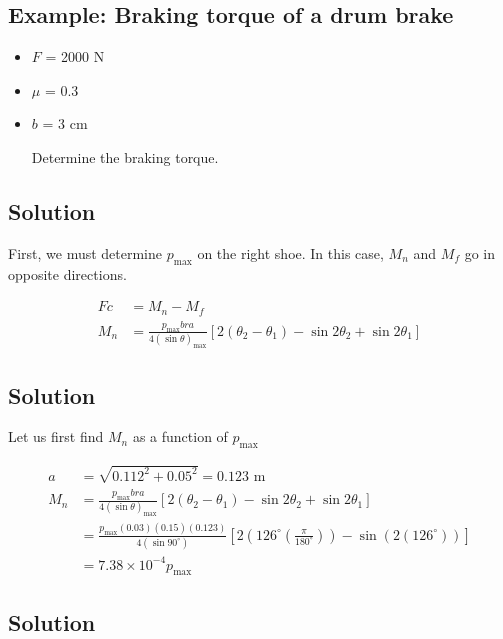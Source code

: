 \documentclass[
10pt,
a4paper,
openany,
svgnames,
]{book}
\begin{document}
\subsection*{Example: Braking torque of a drum brake}
\label{sec:orgdb8bef9}

\begin{center}
\end{center}
\begin{itemize}
\item \(F\) = 2000 N
\item \(\mu\) = 0.3
\item \(b\) = 3 cm

Determine the braking torque.
\end{itemize}

\subsection*{Solution}
\label{sec:orgf11f5c5}

First, we must determine \(p_{\max}\) on the right shoe. In this case, \(M_n\) and \(M_f\) go in opposite directions.

\begin{align*}
    Fc &= M_n - M_f \\
    M_n &= \frac{p_{\max} bra}{4(\sin \theta)_{\max}} [2(\theta_2 - \theta_1) - \sin 2\theta_2 + \sin 2\theta_1]
\end{align*}

\subsection*{Solution}
\label{sec:org2ca92a2}

Let us first find \(M_n\) as a function of \(p_{\max}\)

\begin{align*}
    a &= \sqrt{ 0.112^2 + 0.05^2 } = 0.123 \text{ m} \\
    M_n &= \frac{p_{\max} bra}{4(\sin \theta)_{\max}} [2(\theta_2 - \theta_1) - \sin 2\theta_2 + \sin 2\theta_1] \\
        &= \frac{p_{\max} (0.03)(0.15)(0.123)}{4 (\sin 90^{\circ})} \left[ 2(126^{\circ}(\frac{\pi}{180^{\circ}})) - \sin (2(126^{\circ})) \right] \\
        &= 7.38 \times 10^{-4} p_{\max}
\end{align*}

\subsection*{Solution}
\label{sec:org9102d4c}
\end{document}
